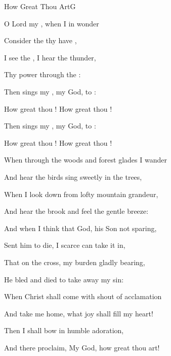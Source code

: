 \begin{song}{How Great Thou Art}{G}
    {}
    {}
    {}
    {\CCLIed}

\begin{SBVerse}
O Lord my , when I in  wonder

Consider  the  thy  have ,

I see the , I hear the  thunder,

Thy power through the  :
\end{SBVerse}

\begin{SBChorus}
Then sings my , my  God, to :

How great thou ! How great thou !

Then sings my , my  God, to :

How great thou ! How great thou !
\end{SBChorus}

\begin{SBVerse}
When through the woods and forest glades I wander

And hear the birds sing sweetly in the trees,

When I look down from lofty mountain grandeur,

And hear the brook and feel the gentle breeze:
\end{SBVerse}

\begin{SBVerse}
And when I think that God, his Son not sparing,

Sent him to die, I scarce can take it in,

That on the cross, my burden gladly bearing,

He bled and died to take away my sin:
\end{SBVerse}

\begin{SBVerse}
When Christ shall come with shout of acclamation

And take me home, what joy shall fill my heart!

Then I shall bow in humble adoration,

And there proclaim, My God, how great thou art!
\end{SBVerse}
\end{song}


